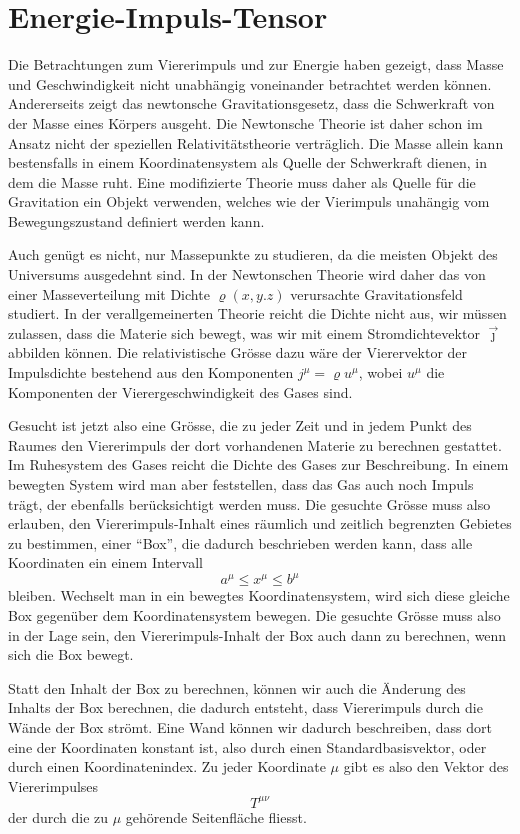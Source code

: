 \section{Energie-Impuls-Tensor}
Die Betrachtungen zum Viererimpuls und zur Energie haben gezeigt, dass
Masse und Geschwindigkeit nicht unabhängig voneinander betrachtet
werden können.
Andererseits zeigt das newtonsche Gravitationsgesetz, dass die Schwerkraft
von der Masse eines Körpers ausgeht.
Die Newtonsche Theorie ist daher schon im Ansatz nicht der
speziellen Relativitätstheorie verträglich.
Die Masse allein kann bestensfalls in einem Koordinatensystem als
Quelle der Schwerkraft dienen, in dem die Masse ruht.
Eine modifizierte Theorie muss daher als Quelle für die Gravitation
ein Objekt verwenden, welches wie der Vierimpuls unahängig vom
Bewegungszustand definiert werden kann.

Auch genügt es nicht, nur Massepunkte zu studieren, da die meisten
Objekt des Universums ausgedehnt sind.
In der Newtonschen Theorie wird daher das von einer Masseverteilung mit
Dichte $\varrho(x,y.z)$ verursachte Gravitationsfeld studiert.
In der verallgemeinerten Theorie reicht die Dichte nicht aus,
wir müssen zulassen, dass die Materie sich bewegt, was wir mit einem
Stromdichtevektor $\vec\jmath$ 
abbilden können.
Die relativistische Grösse dazu wäre der Vierervektor der Impulsdichte
bestehend aus den Komponenten $j^\mu=\varrho u^\mu$,
wobei $u^\mu$ die Komponenten der Vierergeschwindigkeit des Gases sind.

Gesucht ist jetzt also eine Grösse, die zu jeder Zeit und in jedem
Punkt des Raumes den Viererimpuls der dort vorhandenen Materie zu
berechnen gestattet.
Im Ruhesystem des Gases reicht die Dichte des Gases zur Beschreibung.
In einem bewegten System wird man aber feststellen, dass das Gas auch
noch Impuls trägt, der ebenfalls berücksichtigt werden muss.
Die gesuchte Grösse muss also erlauben, den Viererimpuls-Inhalt eines
räumlich und zeitlich begrenzten Gebietes zu bestimmen, einer ``Box'', 
die dadurch beschrieben werden kann, dass alle Koordinaten ein einem
Intervall
\[
a^\mu \le x^\mu \le b^\mu
\]
bleiben.
Wechselt man in ein bewegtes Koordinatensystem, wird sich diese
gleiche Box gegenüber dem Koordinatensystem bewegen.
Die gesuchte Grösse muss also in der Lage sein, den Viererimpuls-Inhalt
der Box auch dann zu berechnen, wenn sich die Box bewegt.

Statt den Inhalt der Box zu berechnen, können wir auch die Änderung des
Inhalts der Box berechnen, die dadurch entsteht, dass Viererimpuls durch
die Wände der Box strömt.
Eine Wand können wir dadurch beschreiben, dass dort eine der Koordinaten
konstant ist, also durch einen Standardbasisvektor, oder durch einen
Koordinatenindex.
Zu jeder Koordinate $\mu$ gibt es also den Vektor des Viererimpulses
\[
T^{\mu\nu}
\]
der durch die zu $\mu$ gehörende Seitenfläche fliesst.

